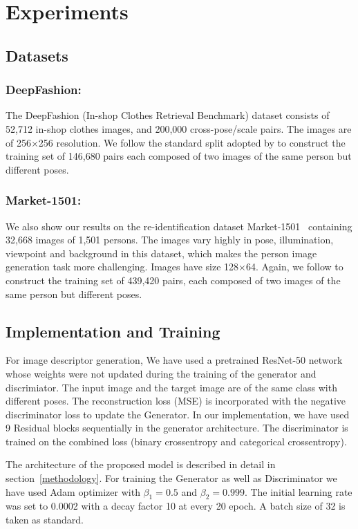 \documentclass[runningheads]{llncs}
\begin{document}
\section{Experiments}
%
\subsection{Datasets}
	\subsubsection{DeepFashion:} The DeepFashion (In-shop Clothes Retrieval Benchmark) dataset \cite{deepfashion} consists of 52,712 in-shop clothes images, and 200,000 cross-pose/scale pairs. The images are of 256$\times$256 resolution. We follow the standard split adopted by \cite{pg2} to construct the training set of 146,680 pairs each composed of two images of the same person but different poses.\vspace{-3mm}
	\subsubsection{Market-1501:} We also show our results on the re-identification dataset Market-1501~\cite{market-1501} containing 32,668 images of 1,501 persons. The images vary highly in pose, illumination, viewpoint and background in this dataset, which makes the person image generation task more challenging. Images have size 128$\times$64. Again, we follow \cite{pg2} to construct the training set of 439,420 pairs, each composed of two images of the same person but different poses.
%
\subsection{Implementation and Training}
For image descriptor generation, We have used a pretrained ResNet-50 network whose weights were not updated during the training of the generator and discrimiator. The input image and the target image are of the same class with different poses. The reconstruction loss (MSE) is incorporated with the negative discriminator loss to update the Generator. In our implementation, we have used 9 Residual blocks sequentially in the generator architecture. The discriminator is trained on the combined loss (binary crossentropy and categorical crossentropy).

The architecture of the proposed model is described in detail in section~\ref{methodology}. For training the Generator as well as Discriminator we have used Adam optimizer with $\beta_1=0.5$ and $\beta_2=0.999$. The initial learning rate was set to 0.0002 with a decay factor 10 at every 20 epoch. A batch size of 32 is taken as standard.
%
\end{document}
